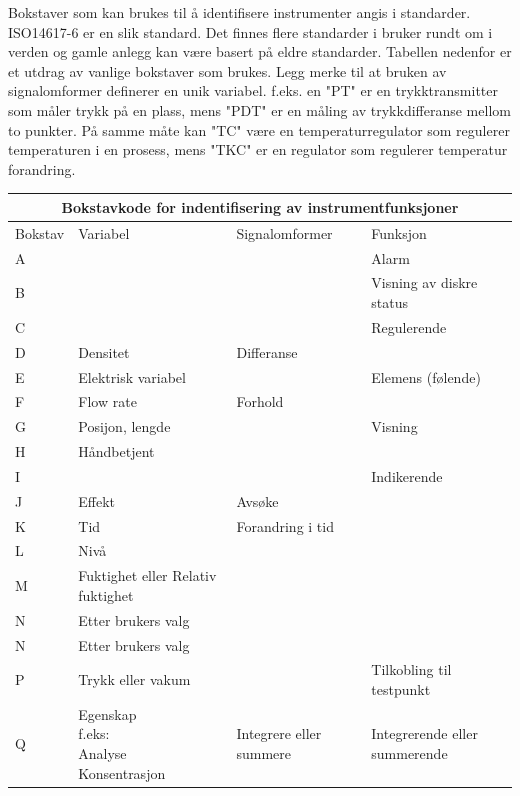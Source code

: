 \filbreak

Bokstaver som kan brukes til å identifisere instrumenter angis i standarder. ISO14617-6 er en slik standard. Det finnes flere standarder i bruker rundt om i verden og gamle anlegg kan være basert på eldre standarder. Tabellen nedenfor er et utdrag av vanlige bokstaver som brukes. Legg merke til at bruken av signalomformer definerer en unik variabel. f.eks. en "PT" er en trykktransmitter som måler trykk på en plass, mens "PDT" er en måling av trykkdifferanse mellom to punkter. På samme måte kan "TC" være en temperaturregulator som regulerer temperaturen i en prosess, mens "TKC" er en regulator som regulerer temperatur forandring. 

\begin{center}
\begin{tabular}{ | m{1.5cm} | m{4.5cm}| m{4.5cm} | m{4.5cm} |} 
\hline
\multicolumn{4}{|c|}{Bokstavkode for indentifisering av instrumentfunksjoner} \\
\hline
	Bokstav & Variabel& Signalomformer & Funksjon \\ 
\hline
	A&&&Alarm\\
\hline
	B&&&Visning av diskre status\\
\hline
	C&&&Regulerende\\
\hline
	D&Densitet&Differanse&\\
\hline
	E&Elektrisk variabel&&Elemens (følende)\\
\hline
	F&Flow rate&Forhold&\\
\hline
	G&Posijon, lengde&&Visning\\
\hline
	H&Håndbetjent&&\\
	\hline
	I&&&Indikerende\\
	\hline
	J&Effekt&Avsøke&\\
	\hline
	K&Tid&Forandring i tid&\\
	\hline
	L&Nivå&&\\
	\hline
	M&Fuktighet eller Relativ fuktighet&&\\
	\hline
	N&Etter brukers valg&&\\
	\hline
	N&Etter brukers valg&&\\
	\hline
	P&Trykk eller vakum&&Tilkobling til testpunkt\\
	\hline
	Q&\makecell{Egenskap\\f.eks:\\*Analyse\\*Konsentrasjon}&Integrere eller summere&Integrerende eller summerende\\

\end{tabular}
\end{center}
